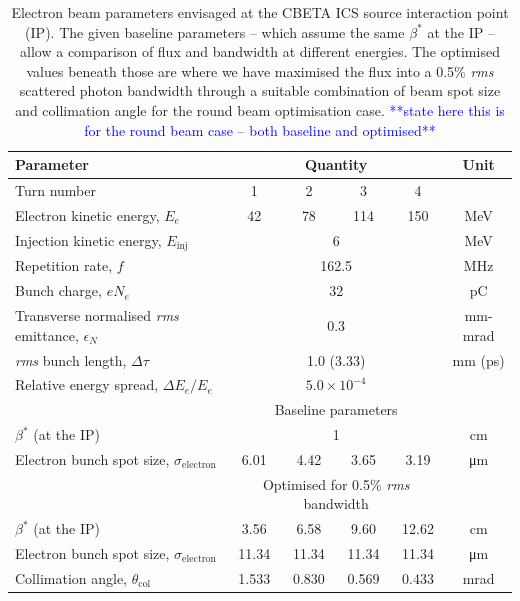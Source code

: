 \documentclass[../main.tex]{subfiles}
\begin{document}
\begin{table}[!h]
\caption{Electron beam parameters envisaged at the CBETA ICS source interaction point (IP). The given baseline parameters -- which assume the same $\beta^*$ at the IP -- allow a comparison of flux and bandwidth at different energies. The optimised values beneath those are where we have maximised the flux into a 0.5\% \textit{rms} scattered photon bandwidth through a suitable combination of beam spot size and collimation angle for the round beam optimisation case. \textcolor{blue}{**state here this is for the round beam case -- both baseline and optimised**}}
\vspace{3mm}
\begin{tabular}{lccccc}
\hline\hline
Parameter & \multicolumn{4}{c}{Quantity} & Unit \\
\hline
Turn number & 1 & 2 & 3 & 4 & \\
Electron kinetic energy, $E_e$ & 42 & 78 & 114 & 150 & \si{\mega\electronvolt}\\
Injection kinetic energy, $E_{\mathrm{inj}}$ & \multicolumn{4}{c}{6} & \si{\mega\electronvolt} \\
Repetition rate, $f$ & \multicolumn{4}{c}{162.5} & \si{\mega\hertz}\\
Bunch charge, $e N_e$ & \multicolumn{4}{c}{32} & \si{\pico\coulomb} \\
Transverse normalised \textit{rms} emittance, $\epsilon_{N}$ & \multicolumn{4}{c}{0.3} & \si{\milli\meter}-\si{\milli\radian}\\
\textit{rms} bunch length, $\Delta \tau$ & \multicolumn{4}{c}{1.0 (3.33)} & \si{\milli\meter} (\si{\pico\second})\\
Relative energy spread, $\Delta E_{e}/E_{e}$ & \multicolumn{4}{c}{$5.0\times 10^{-4}$} & \\
\hline
 & \multicolumn{4}{c}{Baseline parameters} & \\
\hline
$\beta^*$ (at the IP) & \multicolumn{4}{c}{1} & \si{\centi\meter}\\
Electron bunch spot size, $\sigma_{\mathrm{electron}}$ & 6.01 & 4.42 & 3.65 & 3.19  & \si{\micro\meter} \\
\hline
 & \multicolumn{4}{c}{Optimised for 0.5\% \textit{rms} bandwidth} & \\
\hline
$\beta^*$ (at the IP) & 3.56 & 6.58 & 9.60 & 12.62 & \si{\centi\meter}\\
Electron bunch spot size, $\sigma_{\mathrm{electron}}$ & 11.34 & 11.34 & 11.34 & 11.34  & \si{\micro\meter}\\
Collimation angle, $\theta_{\mathrm{col}}$ & 1.533 & 0.830 & 0.569 & 0.433 & \si{\milli\radian}\\
\hline\hline
\end{tabular}
\label{tab:CBETA_electron_beam_design_parameters}
\end{table}
\end{document}
